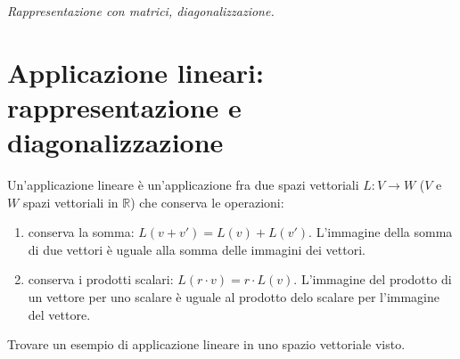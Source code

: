 \begin{center}
\indent
\textit{Rappresentazione con matrici, diagonalizzazione.}
\end{center}

\section{Applicazione lineari: rappresentazione e diagonalizzazione}

Un'applicazione lineare \`e un'applicazione fra due spazi vettoriali $L : V \to W$ ($V$ e $W$ spazi vettoriali in $\mathbb{R}$) che conserva le operazioni:

\begin{enumerate}
    \item conserva la somma: $L (v + v') = L(v) + L(v')$. L'immagine della somma di due vettori \`e uguale alla somma delle immagini dei vettori.
    \item conserva i prodotti scalari: $L(r \cdot v) = r \cdot L(v)$. L'immagine del prodotto di un vettore per uno scalare \`e uguale al prodotto delo scalare per l'immagine del vettore.
\end{enumerate}


Trovare un esempio di applicazione lineare in uno spazio vettoriale visto.